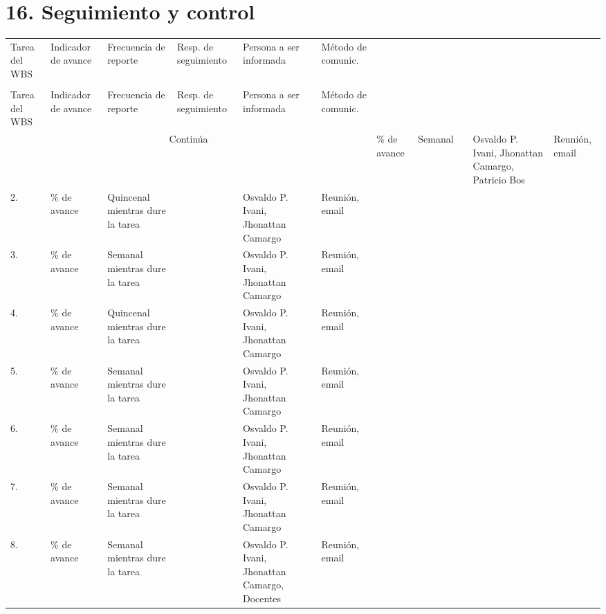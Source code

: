 \documentclass[11pt]{charter}
\begin{document}
\section{16. Seguimiento y control}
\label{sec:seguimiento}



\begin{longtable}{|m{1cm}|m{3.5cm}|m{2.2cm}|m{2cm}|m{3cm}|m{1.5cm}|}
\hline
\rowcolor[HTML]{C0C0C0} 
\multicolumn{6}{|c|}{\cellcolor[HTML]{C0C0C0}SEGUIMIENTO DE AVANCE}                                                                       \\ \hline
\rowcolor[HTML]{C0C0C0} 
Tarea del WBS 			& Indicador de avance & Frecuencia de reporte & Resp. de seguimiento & Persona a ser informada & Método de comunic. \\ \hline
\endfirsthead

\hline
\rowcolor[HTML]{C0C0C0} 
\multicolumn{6}{c}{\cellcolor[HTML]{C0C0C0}SEGUIMIENTO DE AVANCE}                                                                       \\ \hline
\rowcolor[HTML]{C0C0C0} 
Tarea del WBS 			& Indicador de avance & Frecuencia de reporte & Resp. de seguimiento & Persona a ser informada & Método de comunic. \\ \hline
\endhead

\multicolumn{6}{c}{Continúa}
\endfoot

\endlastfoot

1.	& \% de avance & Semanal & \authorname & Osvaldo P. Ivani, Jhonattan Camargo, Patricio Bos & Reunión, email \\ \hline
2.	& \% de avance & Quincenal mientras dure la tarea & \authorname & Osvaldo P. Ivani, Jhonattan Camargo & Reunión, email \\ \hline
3.	& \% de avance & Semanal mientras dure la tarea & \authorname & Osvaldo P. Ivani, Jhonattan Camargo & Reunión, email \\ \hline
4.	& \% de avance & Quincenal mientras dure la tarea & \authorname & Osvaldo P. Ivani, Jhonattan Camargo & Reunión, email \\ \hline
5.	& \% de avance  & Semanal mientras dure la tarea & \authorname & Osvaldo P. Ivani, Jhonattan Camargo & Reunión, email \\ \hline
6.	& \% de avance & Semanal mientras dure la tarea & \authorname & Osvaldo P. Ivani, Jhonattan Camargo & Reunión, email \\ \hline
7.	& \% de avance  & Semanal mientras dure la tarea & \authorname & Osvaldo P. Ivani, Jhonattan Camargo & Reunión, email \\ \hline
8.	& \% de avance  & Semanal mientras dure la tarea & \authorname & Osvaldo P. Ivani, Jhonattan Camargo, Docentes & Reunión, email \\ \hline
\end{longtable}
\end{document}
